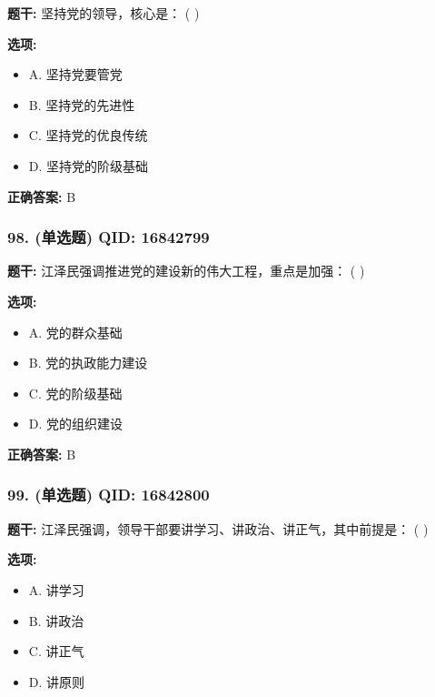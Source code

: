 \documentclass[12pt,UTF8]{ctexart}
\begin{document}
\textbf{题干:}
坚持党的领导，核心是： ( )

\textbf{选项:}
\begin{itemize}[leftmargin=*]

  \item A. 坚持党要管党

  \item B. 坚持党的先进性

  \item C. 坚持党的优良传统

  \item D. 坚持党的阶级基础

\end{itemize}

\textbf{正确答案:}
B

\vspace{0.3em}\hrulefill\vspace{0.7em}

\subsubsection*{98. (单选题) \small QID: 16842799}

\textbf{题干:}
江泽民强调推进党的建设新的伟大工程，重点是加强： ( )

\textbf{选项:}
\begin{itemize}[leftmargin=*]

  \item A. 党的群众基础

  \item B. 党的执政能力建设

  \item C. 党的阶级基础

  \item D. 党的组织建设

\end{itemize}

\textbf{正确答案:}
B

\vspace{0.3em}\hrulefill\vspace{0.7em}

\subsubsection*{99. (单选题) \small QID: 16842800}

\textbf{题干:}
江泽民强调，领导干部要讲学习、讲政治、讲正气，其中前提是： ( )

\textbf{选项:}
\begin{itemize}[leftmargin=*]

  \item A. 讲学习

  \item B. 讲政治

  \item C. 讲正气

  \item D. 讲原则

\end{itemize}
\end{document}
